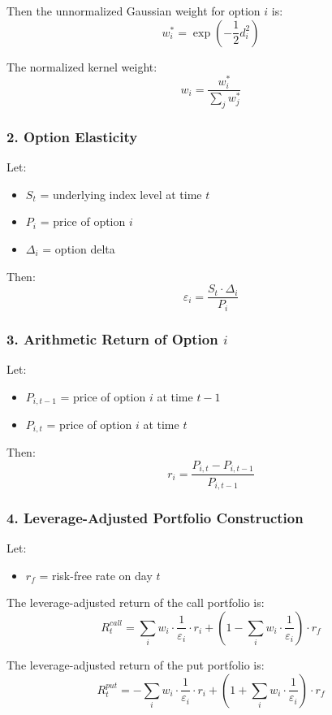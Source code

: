 \documentclass{article}
\begin{document}
\begin{appendices}
Then the unnormalized Gaussian weight for option $i$ is:
\[
w_{i}^* = \exp\left( -\frac{1}{2} d_{i}^2 \right)
\]

The normalized kernel weight:
\[
w_{i} = \frac{w_{i}^*}{\sum_j w_j^*}
\]

\subsubsection*{2. Option Elasticity}

Let:
\begin{itemize}
  \item $S_{t}$ = underlying index level at time $t$
  \item $P_{i}$ = price of option $i$
  \item $\Delta_{i}$ = option delta
\end{itemize}

Then:
\[
\varepsilon_{i} = \frac{S_t \cdot \Delta_{i}}{P_{i}}
\]

\subsubsection*{3. Arithmetic Return of Option $i$}

Let:
\begin{itemize}
  \item $P_{i,t-1}$ = price of option $i$ at time $t-1$
  \item $P_{i,t}$ = price of option $i$ at time $t$
\end{itemize}

Then:
\[
r_{i} = \frac{P_{i,t} - P_{i,t-1}}{P_{i,t-1}}
\]

\subsubsection*{4. Leverage-Adjusted Portfolio Construction}

Let:
\begin{itemize}
  \item $r_{f}$ = risk-free rate on day $t$
\end{itemize}

The leverage-adjusted return of the call portfolio is:
\[
R_t^{call} = \sum_{i} w_{i} \cdot \frac{1}{\varepsilon_{i}} \cdot r_{i} + \left(1 - \sum_{i} w_{i} \cdot \frac{1}{\varepsilon_{i}} \right) \cdot r_f
\]

The leverage-adjusted return of the put portfolio is:
\[
R_t^{put} = -\sum_{i} w_{i} \cdot \frac{1}{\varepsilon_{i}} \cdot r_{i} + \left(1 + \sum_{i} w_{i} \cdot \frac{1}{\varepsilon_{i}} \right) \cdot r_f
\]




\end{appendices}
\end{document}
